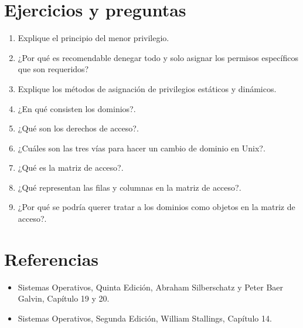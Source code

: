 \section{Ejercicios y preguntas}
\begin{enumerate}
\item Explique el principio del menor privilegio.
\item ¿Por qué es recomendable denegar todo y solo asignar los permisos
específicos que son requeridos?
\item Explique los métodos de asignación de privilegios estáticos y dinámicos.
\item ¿En qué consisten los dominios?.
\item ¿Qué son los derechos de acceso?.
\item ¿Cuáles son las tres vías para hacer un cambio de dominio en Unix?.
\item ¿Qué es la matriz de acceso?.
\item ¿Qué representan las filas y columnas en la matriz de acceso?.
\item ¿Por qué se podría querer tratar a los dominios como objetos en la matriz
de acceso?.
\end{enumerate}

\section{Referencias}
\begin{itemize}
\item Sistemas Operativos, Quinta Edición, Abraham Silberschatz y Peter Baer
Galvin, Capítulo 19 y 20.
\item Sistemas Operativos, Segunda Edición, William Stallings, Capítulo 14.
\end{itemize}
